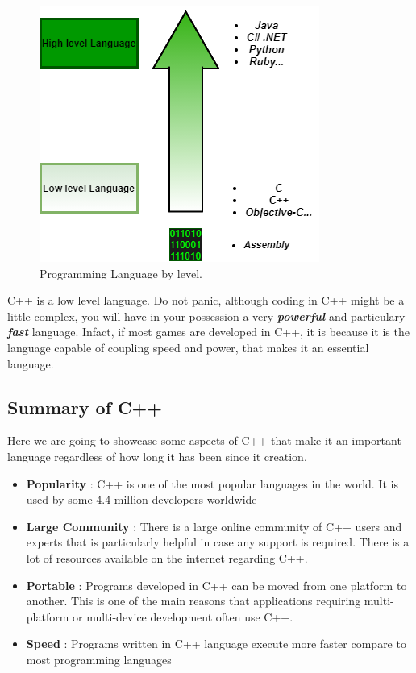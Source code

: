 \documentclass[11pt, a4paper]{article}
\begin{document}
\begin{figure}[!ht]
    \includegraphics[width = \linewidth]{diagrams/low vs high.png}
    \caption{Programming Language by level.}
    \label{fig:Programming Language by level}
\end{figure}
C++ is a low level language. Do not panic, although coding in C++ might be a little complex, you will 
have in your possession a very \textbf{\textit{{powerful}}} and particulary \textbf{\textit{{fast}}} language.
Infact, if most games are developed in C++, it is because it is the language capable of coupling
speed and power, that makes it an essential language.



\subsection{Summary of C++}
Here we are going to showcase some aspects of C++ that make it an important language regardless of
how long it has been since it creation.
\begin{itemize}
    \item \textbf{Popularity} : C++ is one of the most popular
    languages in the world. It is used by some 4.4 million developers worldwide
    \item \textbf{Large Community} : There is a large online community
    of C++ users and experts that is particularly helpful in case any support is required.
    There is a lot of resources available on the internet regarding C++.
    \item \textbf{Portable} : Programs developed in C++ can be moved from one platform
    to another. This is one of the main reasons that applications requiring multi-platform
    or multi-device development often use C++.
    \item  \textbf{Speed} : Programs written in C++ language execute more faster compare
    to most programming languages\end{itemize}
\end{document}

